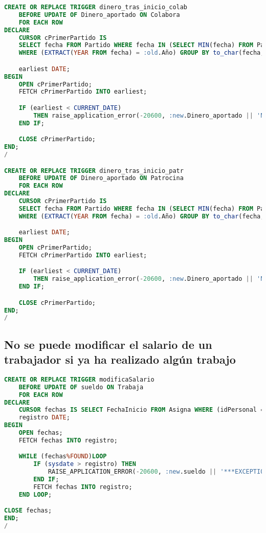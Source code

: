 \begin{lstlisting}[language=sql]
CREATE OR REPLACE TRIGGER dinero_tras_inicio_colab
	BEFORE UPDATE OF Dinero_aportado ON Colabora
	FOR EACH ROW
DECLARE
	CURSOR cPrimerPartido IS
	SELECT fecha FROM Partido WHERE fecha IN (SELECT MIN(fecha) FROM Partido
	WHERE (EXTRACT(YEAR FROM fecha) = :old.Año) GROUP BY to_char(fecha,'YYYY')) GROUP BY fecha;

	earliest DATE;
BEGIN
	OPEN cPrimerPartido;
	FETCH cPrimerPartido INTO earliest;

	IF (earliest < CURRENT_DATE)
		THEN raise_application_error(-20600, :new.Dinero_aportado || 'No se puede modificar el dinero aportado si ya ha comenzado el torneo');
	END IF;

	CLOSE cPrimerPartido;
END;
/

CREATE OR REPLACE TRIGGER dinero_tras_inicio_patr
	BEFORE UPDATE OF Dinero_aportado ON Patrocina
	FOR EACH ROW
DECLARE
	CURSOR cPrimerPartido IS
	SELECT fecha FROM Partido WHERE fecha IN (SELECT MIN(fecha) FROM Partido
	WHERE (EXTRACT(YEAR FROM fecha) = :old.Año) GROUP BY to_char(fecha,'YYYY')) GROUP BY fecha;

	earliest DATE;
BEGIN
	OPEN cPrimerPartido;
	FETCH cPrimerPartido INTO earliest;

	IF (earliest < CURRENT_DATE)
		THEN raise_application_error(-20600, :new.Dinero_aportado || 'No se puede modificar el dinero aportado si ya ha comenzado el torneo');
	END IF;

	CLOSE cPrimerPartido;
END;
/
\end{lstlisting}

\subsection{No se puede modificar el salario de un trabajador si ya ha realizado algún trabajo}

\begin{lstlisting}[language=sql]
CREATE OR REPLACE TRIGGER modificaSalario
	BEFORE UPDATE OF sueldo ON Trabaja
	FOR EACH ROW
DECLARE
	CURSOR fechas IS SELECT FechaInicio FROM Asigna WHERE (idPersonal = :new.idPersonal) ;
	registro DATE;
BEGIN
	OPEN fechas;
	FETCH fechas INTO registro;

	WHILE (fechas%FOUND)LOOP
		IF (sysdate > registro) THEN
			RAISE_APPLICATION_ERROR(-20600, :new.sueldo || '***EXCEPTION**** No se puede modificar el sueldo ya que ya ha empezado su trabajo');
		END IF;
		FETCH fechas INTO registro;
	END LOOP;

CLOSE fechas;
END;
/
\end{lstlisting}


